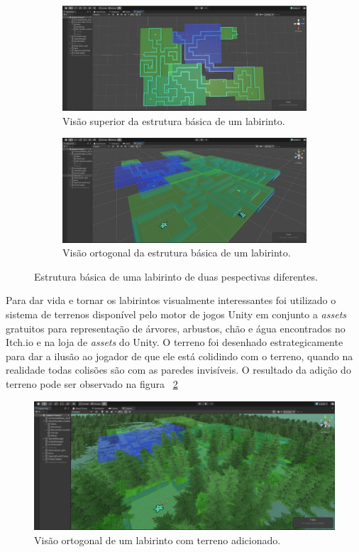 \documentclass[
	12pt,				%
	openright,			%
	twoside,			%
	a4paper,			%
	english,			%
	french,				%
	spanish,			%
	brazil				%
	]{abntex2}
\begin{document}
\begin{figure}[h!]
  \centering
  \begin{subfigure}[b]{0.75\linewidth}
    \includegraphics[width=\linewidth]{basicLab.png}
     \caption{Visão superior da estrutura básica de um labirinto.}
  \end{subfigure}
  \begin{subfigure}[b]{0.75\linewidth}
    \includegraphics[width=\linewidth]{basicLab2.png}
    \caption{Visão ortogonal da estrutura básica de um labirinto.}
  \end{subfigure}
  \caption{Estrutura básica de uma labirinto de duas pespectivas diferentes.}
  \label{fig:basicLab}
\end{figure}

Para dar vida e tornar os labirintos visualmente interessantes foi utilizado o sistema de terrenos disponível pelo motor de jogos Unity em conjunto a \emph{assets} gratuitos para representação de árvores, arbustos, chão e água encontrados no Itch.io e na loja de \emph{assets} do Unity. O terreno foi desenhado estrategicamente para dar a ilusão ao jogador de que ele está colidindo com o terreno, quando na realidade todas colisões são com as paredes invisíveis. O resultado da adição do terreno pode ser observado na figura ~\ref{fig:terrain}

\begin{figure}[h!]
 \centering
  \includegraphics[width=0.75\linewidth]{prettyLab.png}
  \caption{Visão ortogonal de um labirinto com terreno adicionado.}
  \label{fig:terrain}
\end{figure}
\end{document}
